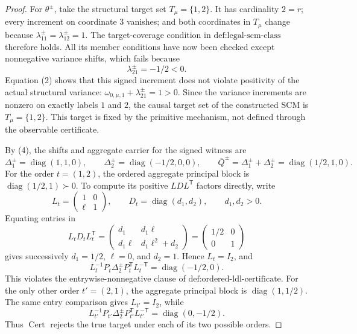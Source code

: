 \documentclass{article}
\begin{document}
\begin{proof}
For \(\theta^{\pm}\), take the structural target set \(T_\mu=\{1,2\}\).  It has cardinality \(2=r\); every increment on coordinate \(3\) vanishes; and both coordinates in \(T_\mu\) change because \(\lambda^{\pm}_{11}=\lambda^{\pm}_{12}=1\).  The target-coverage condition in \(\text{def:legal-scm-class}\) therefore holds.  All its member conditions have now been checked except nonnegative variance shifts, which fails because
\[
 \lambda^{\pm}_{21}=-1/2<0. \tag{5}
\]
Equation (2) shows that this signed increment does not violate positivity of the actual structural variance: \(\omega_{0,\mu,1}+\lambda^{\pm}_{21}=1>0\).  Since the variance increments are nonzero on exactly labels \(1\) and \(2\), the causal target set of the constructed SCM is \(T_\mu=\{1,2\}\).  This target is fixed by the primitive mechanism, not defined through the observable certificate.

By (4), the shifts and aggregate carrier for the signed witness are
\[
 \Delta^{\pm}_1=\operatorname{diag}(1,1,0),\qquad
 \Delta^{\pm}_2=\operatorname{diag}(-1/2,0,0),\qquad
 \bar Q^{\pm}=\Delta^{\pm}_1+\Delta^{\pm}_2
 =\operatorname{diag}(1/2,1,0). \tag{6}
\]
For the order \(t=(1,2)\), the ordered aggregate principal block is \(\operatorname{diag}(1/2,1)\succ0\).  To compute its positive \(LDL^{\mathsf T}\) factors directly, write
\[
 L_t=\begin{pmatrix}1&0\\ \ell&1\end{pmatrix},\qquad
 D_t=\operatorname{diag}(d_1,d_2),\qquad d_1,d_2>0.
\]
Equating entries in
\[
 L_tD_tL_t^{\mathsf T}
 =\begin{pmatrix}d_1&d_1\ell\\d_1\ell&d_1\ell^2+d_2\end{pmatrix}
 =\begin{pmatrix}1/2&0\\0&1\end{pmatrix}
\]
gives successively \(d_1=1/2\), \(\ell=0\), and \(d_2=1\).  Hence \(L_t=I_2\), and
\[
 L_t^{-1}P_t\Delta^{\pm}_2P_t^{\mathsf T}L_t^{-\mathsf T}
 =\operatorname{diag}(-1/2,0). \tag{7}
\]
This violates the entrywise-nonnegative clause of \(\text{def:ordered-ldl-certificate}\).  For the only other order \(t'=(2,1)\), the aggregate principal block is \(\operatorname{diag}(1,1/2)\).  The same entry comparison gives \(L_{t'}=I_2\), while
\[
 L_{t'}^{-1}P_{t'}\Delta^{\pm}_2P_{t'}^{\mathsf T}L_{t'}^{-\mathsf T}
 =\operatorname{diag}(0,-1/2). \tag{8}
\]
Thus \(\operatorname{Cert}\) rejects the true target under each of its two possible orders.


\end{proof}
\end{document}

